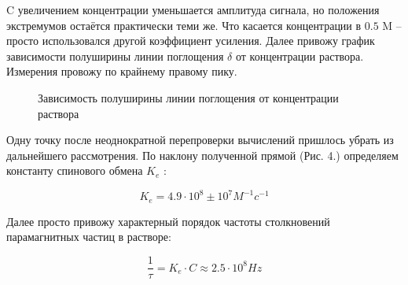 \documentclass[a4paper,12pt]{article}
\theoremstyle{plain} %
\theoremstyle{definition} %
\theoremstyle{remark} %
\begin{document}
C увеличением концентрации уменьшается амплитуда сигнала, но положения экстремумов остаётся практически теми же.
Что касается концентрации в $0.5$ M -- просто использовался другой коэффициент усиления.
Далее привожу график зависимости полуширины линии поглощения $\delta $ от концентрации раствора. Измерения провожу по 
крайнему правому пику.

\begin{figure}[h!]
	\caption{Зависимость полуширины линии
		поглощения от концентрации
		раствора}
	\label{fig:image}
\end{figure}

Одну точку после неоднократной перепроверки вычислений пришлось убрать из дальнейшего рассмотрения.
По наклону полученной прямой (Рис. 4.) определяем константу спинового обмена $K_e $ :

\begin{equation}
	K_e = 4.9 \cdot 10^8 \pm 10^{7} M^{-1}c^{-1}
\end{equation}

\newpage

Далее просто привожу характерный порядок частоты столкновений парамагнитных частиц в растворе:

\begin{equation}
\frac{1}{\tau} = K_e \cdot C \approx 2.5 \cdot 10^8 Hz
\end{equation}
\end{document}
